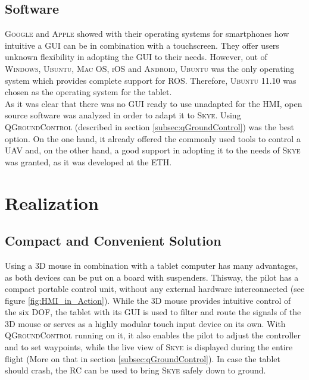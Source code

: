 \subsection{Software}
\textsc{Google} and \textsc{Apple} showed  with their operating systems for smartphones how intuitive a GUI can be in combination with a  touchscreen. They offer users unknown flexibility in adopting the GUI to their needs. However, out of \textsc{Windows}, \textsc{Ubuntu}, \textsc{Mac OS}, \textsc{iOS} and \textsc{Android}, \textsc{Ubuntu} was the only operating system which provides complete support for \textsc{ROS}. Therefore, \textsc{Ubuntu 11.10} was chosen as the operating system for the tablet.\\
As it was clear that there was no GUI ready to use unadapted for the HMI, open source software was analyzed in order to adapt it to \textsc{Skye}. Using \textsc{QGroundControl} (described in section \ref{subsec:qGroundControl}) was the best option. On the one hand, it already offered the commonly used tools to control a UAV and, on the other hand, a good support in adopting it to the needs of \textsc{Skye} was granted, as it was developed at the \textsc{ETH}.


\section{Realization}
\label{sec:realization}

\subsection{Compact and Convenient Solution}
Using a 3D mouse in combination with a tablet computer has many advantages, as both devices can be put on a board with suspenders. Thisway, the pilot has a compact portable control unit, without any external hardware interconnected (see figure \ref{fig:HMI_in_Action}). While the 3D mouse provides intuitive control of the six DOF, the tablet with its GUI is used to filter and route the signals of the 3D mouse or serves as a highly modular touch input device on its own. With \textsc{QGroundControl} running on it, it also enables the pilot to adjust the controller and to set waypoints, while the live view of \textsc{Skye} is displayed during the entire flight (More on that in section \ref{subsec:qGroundControl}). In case the tablet should crash, the RC can be used to bring \textsc{Skye} safely down to ground.

